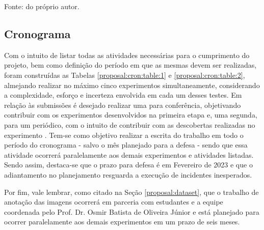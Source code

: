 \begin{table}[H]
    \vspace*{1cm}
    Fonte: do próprio autor.
\end{table}


\subsection{Cronograma}
\label{proposal:cron}
Com o intuito de listar todas as atividades necessárias para o cumprimento do projeto, bem como definição do período em que as mesmas devem ser realizadas, foram construídas as Tabelas \ref{proposal:cron:table:1} e \ref{proposal:cron:table:2}, almejando realizar no máximo cinco  experimentos simultaneamente, considerando a complexidade, esforço e incerteza envolvida em cada um desses testes. Em relação às submissões é desejado realizar uma para conferência, objetivando  contribuir com os experimentos desenvolvidos na primeira etapa e, uma segunda, para um periódico, com o intuito de contribuir com as descobertas realizadas no experimento . Tem-se como objetivo realizar a escrita do trabalho em todo o período do cronograma - salvo o mês planejado para a defesa - sendo que essa atividade ocorrerá paralelamente aos demais experimentos e atividades listadas. Sendo assim, destaca-se que o prazo para defesa é em Fevereiro de 2023 e que o adiantamento no planejamento resguarda a execução de incidentes inesperados.

Por fim, vale lembrar, como citado na Seção \ref{proposal:dataset}, que o trabalho de anotação das imagens ocorrerá em parceria com estudantes e a equipe coordenada pelo Prof. Dr. Osmir Batista de Oliveira Júnior e está planejado para ocorrer paralelamente aos demais experimentos em um prazo de seis meses.


